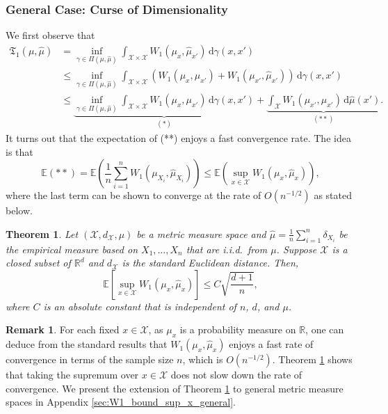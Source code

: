 \documentclass[11pt,letterpaper]{article}
\newtheorem{theorem}{Theorem} %
\theoremstyle{definition}
\newtheorem{remark}{Remark}
\numberwithin{equation}{section}
\newcommand{\cX}{\mathcal{X}}
\newcommand{\R}{\mathbb{R}}
\newcommand{\E}{\mathbb{E}} %
\begin{document}
\subsubsection{General Case: Curse of Dimensionality} 
We first observe that
\begin{equation}
    \label{eq:TLB_decomposition}
    \begin{split}
        \mathfrak{T}_1(\mu, \hat{\mu}) 
        & = \inf_{\gamma \in \Pi(\mu, \hat{\mu})} \int_{\cX \times \cX} W_1(\mu_x, \hat{\mu}_{x'}) \, \mathrm{d} \gamma(x, x') \\
        & \le \inf_{\gamma \in \Pi(\mu, \hat{\mu})} \int_{\cX \times \cX} \left(W_1(\mu_x, \mu_{x'}) + W_1(\mu_{x'}, \hat{\mu}_{x'})\right) \, \mathrm{d} \gamma(x, x') \\
        & \le \underbrace{\inf_{\gamma \in \Pi(\mu, \hat{\mu})} \int_{\cX \times \cX} W_1(\mu_x, \mu_{x'}) \, \mathrm{d} \gamma(x, x')}_{(*)} + \underbrace{\int_{\cX} W_1(\mu_{x'}, \hat{\mu}_{x'}) \, \mathrm{d} \hat{\mu}(x')}_{(**)}.
    \end{split}
\end{equation}
It turns out that the expectation of (**) enjoys a fast convergence rate. The idea is that
\begin{equation}
    \label{eq:TLB_decomposition_fast_part}
    \E(**) = \E\left(\frac{1}{n} \sum_{i = 1}^{n} W_1(\mu_{X_i}, \hat{\mu}_{X_i})\right) \le \E\left(\sup_{x \in \cX} W_1(\mu_x, \hat{\mu}_x)\right),
\end{equation}
where the last term can be shown to converge at the rate of $O(n^{-1/2})$ as stated below. 
\begin{theorem}
    \label{thm:W1_bound_sup_x_euclidean}
    Let $(\cX, d_\cX, \mu)$ be a metric measure space and $\hat{\mu} = \frac{1}{n} \sum_{i = 1}^{n} \delta_{X_i}$ be the empirical measure based on $X_1, \ldots, X_n$ that are i.i.d.\ from $\mu$. Suppose $\cX$ is a closed subset of $\R^d$ and $d_\cX$ is the standard Euclidean distance. Then, 
    \begin{equation}
        \label{eq:sup_W1_euclidean}
        \E\left[\sup_{x \in \cX} W_1(\mu_x, \hat{\mu}_x)\right] \le C \sqrt{\frac{d + 1}{n}},
    \end{equation}
    where $C$ is an absolute constant that is independent of $n$, $d$, and $\mu$.
\end{theorem}

\begin{remark}
    For each fixed $x \in \cX$, as $\mu_x$ is a probability measure on $\R$, one can deduce from the standard results \citep{dudley1969speed,fournier2015rate} that $W_1(\mu_x, \hat{\mu}_x)$ enjoys a fast rate of convergence in terms of the sample size $n$, which is $O(n^{-1 / 2})$. Theorem \ref{thm:W1_bound_sup_x_euclidean} shows that taking the supremum over $x \in \cX$ does not slow down the rate of convergence. We present the extension of Theorem \ref{thm:W1_bound_sup_x_euclidean} to general metric measure spaces in Appendix \ref{sec:W1_bound_sup_x_general}.
\end{remark}
\end{document}
